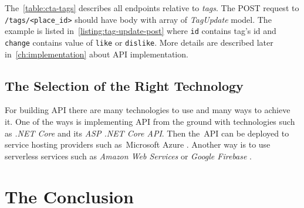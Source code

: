 The~\cref{table:cta-tags} describes all endpoints relative to \textit{tags}. The POST request to \verb|/tags/<place_id>| should have body with array of \textit{TagUpdate} model. The example is listed in~\cref{listing:tag-update-post} where \verb|id| contains tag's id and \verb|change| contains value of \verb|like| or \verb|dislike|. More details are described later in~\cref{ch:implementation} about API implementation.

\subsection{The Selection of the Right Technology}
For building API there are many technologies to use and many ways to achieve it. One of the ways is implementing API from the ground with technologies such as \textit{.NET Core} and its \textit{ASP .NET Core API}. Then the~API can be deployed to service hosting providers such as~Microsoft Azure . Another way is to use serverless services such as \textit{Amazon Web Services}  or \textit{Google Firebase} . 

\section{The Conclusion}


